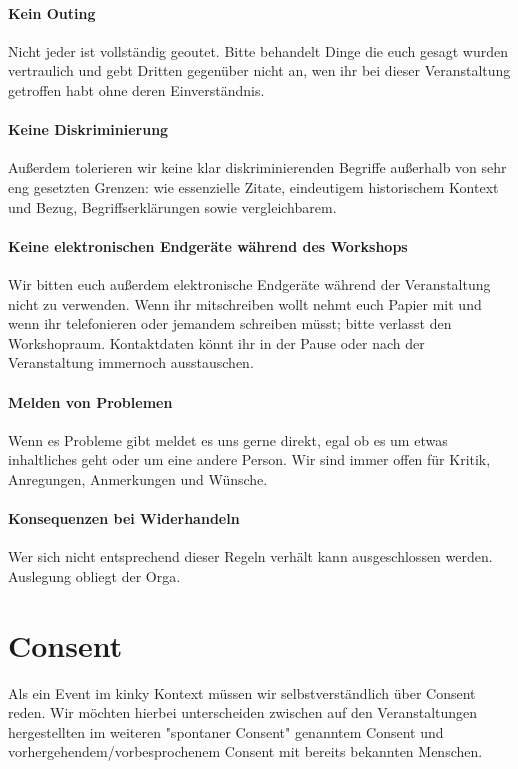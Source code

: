 \documentclass{article}
\begin{document}
\paragraph{\textcolor{PastelRed}{Kein Outing}}
Nicht jeder ist vollständig geoutet. Bitte behandelt Dinge die euch gesagt wurden vertraulich und gebt Dritten gegenüber nicht an, wen ihr bei dieser Veranstaltung getroffen habt ohne deren Einverständnis.
\paragraph{\textcolor{PastelRed}{Keine Diskriminierung}}
Außerdem tolerieren wir keine klar diskriminierenden Begriffe außerhalb von sehr eng gesetzten Grenzen: wie essenzielle Zitate, eindeutigem historischem Kontext und Bezug, Begriffserklärungen sowie vergleichbarem.
\paragraph{\textcolor{PastelRed}{Keine elektronischen Endgeräte während des Workshops}}
Wir bitten euch außerdem elektronische Endgeräte während der Veranstaltung nicht zu verwenden. Wenn ihr mitschreiben wollt nehmt euch Papier mit und wenn ihr telefonieren oder jemandem schreiben müsst; bitte verlasst den Workshopraum. Kontaktdaten könnt ihr in der Pause oder nach der Veranstaltung immernoch ausstauschen.
\paragraph{\textcolor{PastelRed}{Melden von Problemen}}
Wenn es Probleme gibt meldet es uns gerne direkt, egal ob es um etwas inhaltliches geht oder um eine andere Person. Wir sind immer offen für Kritik, Anregungen, Anmerkungen und Wünsche.
\paragraph{\textcolor{PastelRed}{Konsequenzen bei Widerhandeln}}
Wer sich nicht entsprechend dieser Regeln verhält kann ausgeschlossen werden. Auslegung obliegt der Orga.

\section{Consent}
Als ein Event im kinky Kontext müssen wir selbstverständlich über Consent reden. Wir möchten hierbei unterscheiden zwischen auf den Veranstaltungen hergestellten im weiteren "spontaner Consent" genanntem Consent und vorhergehendem/vorbesprochenem Consent mit bereits bekannten Menschen.
\end{document}
